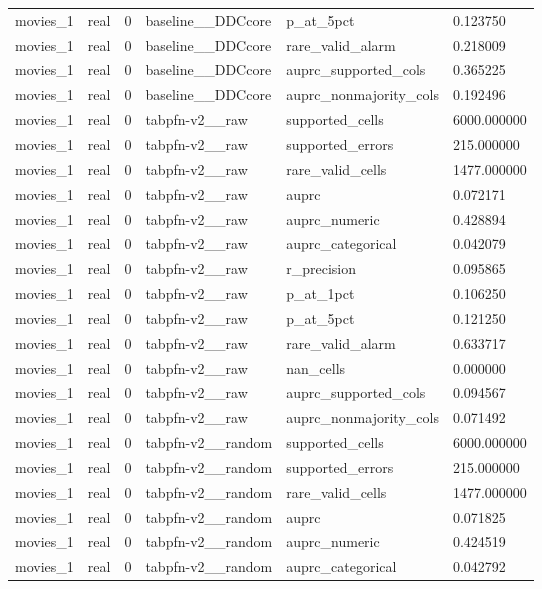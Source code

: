 \begin{tabular}{llllll}
movies\_1 & real & 0 & baseline\_\_DDCcore & p\_at\_5pct & 0.123750 \\
movies\_1 & real & 0 & baseline\_\_DDCcore & rare\_valid\_alarm & 0.218009 \\
movies\_1 & real & 0 & baseline\_\_DDCcore & auprc\_supported\_cols & 0.365225 \\
movies\_1 & real & 0 & baseline\_\_DDCcore & auprc\_nonmajority\_cols & 0.192496 \\
movies\_1 & real & 0 & tabpfn-v2\_\_raw & supported\_cells & 6000.000000 \\
movies\_1 & real & 0 & tabpfn-v2\_\_raw & supported\_errors & 215.000000 \\
movies\_1 & real & 0 & tabpfn-v2\_\_raw & rare\_valid\_cells & 1477.000000 \\
movies\_1 & real & 0 & tabpfn-v2\_\_raw & auprc & 0.072171 \\
movies\_1 & real & 0 & tabpfn-v2\_\_raw & auprc\_numeric & 0.428894 \\
movies\_1 & real & 0 & tabpfn-v2\_\_raw & auprc\_categorical & 0.042079 \\
movies\_1 & real & 0 & tabpfn-v2\_\_raw & r\_precision & 0.095865 \\
movies\_1 & real & 0 & tabpfn-v2\_\_raw & p\_at\_1pct & 0.106250 \\
movies\_1 & real & 0 & tabpfn-v2\_\_raw & p\_at\_5pct & 0.121250 \\
movies\_1 & real & 0 & tabpfn-v2\_\_raw & rare\_valid\_alarm & 0.633717 \\
movies\_1 & real & 0 & tabpfn-v2\_\_raw & nan\_cells & 0.000000 \\
movies\_1 & real & 0 & tabpfn-v2\_\_raw & auprc\_supported\_cols & 0.094567 \\
movies\_1 & real & 0 & tabpfn-v2\_\_raw & auprc\_nonmajority\_cols & 0.071492 \\
movies\_1 & real & 0 & tabpfn-v2\_\_random & supported\_cells & 6000.000000 \\
movies\_1 & real & 0 & tabpfn-v2\_\_random & supported\_errors & 215.000000 \\
movies\_1 & real & 0 & tabpfn-v2\_\_random & rare\_valid\_cells & 1477.000000 \\
movies\_1 & real & 0 & tabpfn-v2\_\_random & auprc & 0.071825 \\
movies\_1 & real & 0 & tabpfn-v2\_\_random & auprc\_numeric & 0.424519 \\
movies\_1 & real & 0 & tabpfn-v2\_\_random & auprc\_categorical & 0.042792 \\

\end{tabular}

